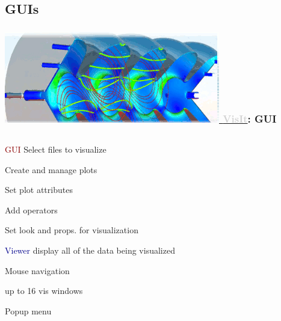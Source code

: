 \subsection{GUIs}
\begin{frame}
\frametitle{\href{https://wci.llnl.gov/simulation/computer-codes/visit/}{\href{https://wci.llnl.gov/simulation/computer-codes/visit/}{\includegraphics[height=.875cm]{figs/visit-logos/VisIt-02}} {\bf \textcolor{lightgray}{VisIt}}}: GUI}

\begin{columns}
\begin{column}{5.5cm}
\pause
\begin{beamerboxesrounded}[upper=block head,lower=block body,shadow=true]{  \textcolor{DarkRed}{GUI} }
        \textcolor{DarkRed}{} Select files to visualize

        \textcolor{DarkRed}{} Create and manage plots

        \textcolor{DarkRed}{} Set plot attributes

        \textcolor{DarkRed}{} Add operators

        \textcolor{DarkRed}{} Set look and props. for visualization
\end{beamerboxesrounded}
\pause
\begin{beamerboxesrounded}[upper=block head,lower=block body,shadow=true]{ \textcolor{DarkBlue}{Viewer} }
        \textcolor{DarkBlue}{} display all of the data being visualized

        \textcolor{DarkBlue}{} Mouse navigation

        \textcolor{DarkBlue}{} up to 16 vis windows

        \textcolor{DarkBlue}{} Popup menu


\end{beamerboxesrounded}
\end{column}
\end{columns}
\end{frame}
